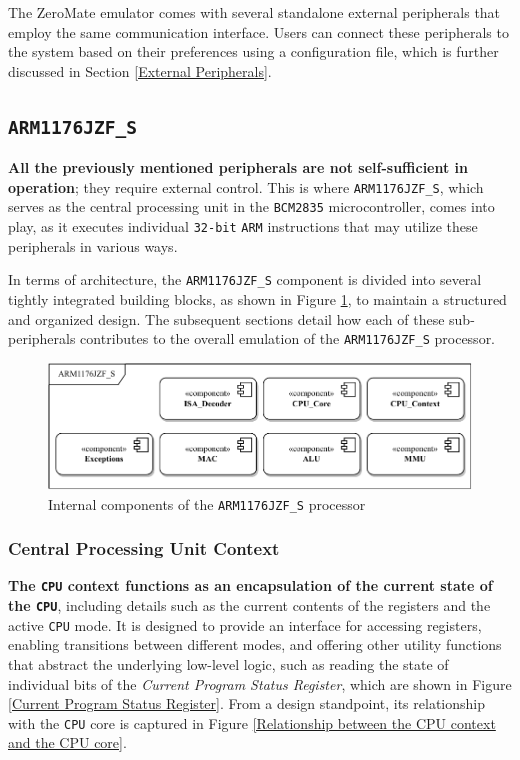 \documentclass[english, ing, kiv, he, iso690numb, pdf]{fasthesis}
\begin{document}
	The ZeroMate emulator comes with several standalone external peripherals that employ the same communication interface. Users can connect these peripherals to the system based on their preferences using a configuration file, which is further discussed in Section \ref{External Peripherals}.
	
	\subsection{\texttt{ARM1176JZF\_S}}
	
	\textbf{All the previously mentioned peripherals are not self-sufficient in operation}; they require external control. This is where \texttt{ARM1176JZF\_S}, which serves as the central processing unit in the \texttt{BCM2835} microcontroller, comes into play, as it executes individual \texttt{32-bit} \texttt{ARM} instructions that may utilize these peripherals in various ways.
	
	In terms of architecture, the \texttt{ARM1176JZF\_S} component is divided into several tightly integrated building blocks, as shown in Figure \ref{Internal components of the ARM1176JZF_S processor}, to maintain a structured and organized design. The subsequent sections detail how each of these sub-peripherals contributes to the overall emulation of the \texttt{ARM1176JZF\_S} processor.
	
	\newpage
	
	\begin{figure}[ht]
		\centering
		\includegraphics[width=1.0\textwidth]{img/diagrams/arm1176jzf_s.pdf}
		\caption{Internal components of the \texttt{ARM1176JZF\_S} processor}
		\label{Internal components of the ARM1176JZF_S processor}
	\end{figure}
	
	\subsubsection{Central Processing Unit Context}
	
	\textbf{The \texttt{CPU} context functions as an encapsulation of the current state of the \texttt{CPU}}, including details such as the current contents of the registers and the active \texttt{CPU} mode. It is designed to provide an interface for accessing registers, enabling transitions between different modes, and offering other utility functions that abstract the underlying low-level logic, such as reading the state of individual bits of the \textit{Current Program Status Register}, which are shown in Figure \ref{Current Program Status Register}. From a design standpoint, its relationship with the \texttt{CPU} core is captured in Figure \ref{Relationship between the CPU context and the CPU core}.
	
\end{document}
